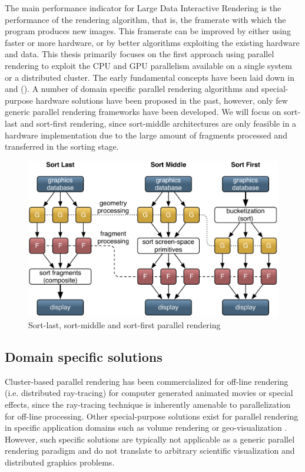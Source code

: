 The main performance indicator for Large Data Interactive Rendering is the
performance of the rendering algorithm, that is, the framerate with which the
program produces new images. This framerate can be improved by either using
faster or more hardware, or by better algorithms exploiting the existing
hardware and data. This thesis primarily focuses on the first approach using
parallel rendering to exploit the CPU and GPU parallelism available on a single
system or a distributed cluster. The early fundamental concepts have been laid
down in \cite{MCEF:94} and \cite{Crockett:97} (). A number of
domain specific parallel rendering algorithms and special-purpose hardware
solutions have been proposed in the past, however, only few generic parallel
rendering frameworks have been developed. We will focus on sort-last and
sort-first rendering, since sort-middle architectures are only feasible in a
hardware implementation due to the large amount of fragments processed and
transferred in the sorting stage.

\begin{figure}[h!t]\center
 \includegraphics[width=\textwidth]{images/all_sorts}%
 \caption{Sort-last, sort-middle and sort-first parallel rendering\label{fSorts}}
\end{figure}


\subsection{Domain specific solutions}

Cluster-based parallel rendering has been commercialized for off-line rendering
(i.e. distributed ray-tracing) for computer generated animated movies or special
effects, since the ray-tracing technique is inherently amenable to
parallelization for off-line processing. Other special-purpose solutions exist
for parallel rendering in specific application domains such as volume rendering
\cite{LWMT:97,Wittenbrink:98,HSCSM:00,SL:02,GS:02,NSJLYZ:05} or
geo-visualization \cite{VR:91,AG:95,LDC:96,JLMV:06}. However, such specific
solutions are typically not applicable as a generic parallel rendering paradigm
and do not translate to arbitrary scientific visualization and distributed
graphics problems.

